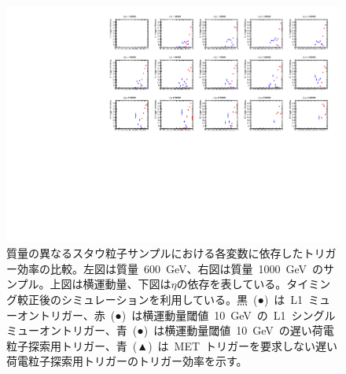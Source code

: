 \begin{figure}[tbp]
\begin{minipage}{0.49\hsize}
    \end{minipage}
    \begin{minipage}{0.49\hsize}
    \centering   
    \includegraphics[width=\textwidth,page=9]{img/rec/stau_1000.pdf}
    \end{minipage}
    \caption[質量の異なるスタウ粒子サンプルにおける各変数に依存したトリガー効率の比較]{質量の異なるスタウ粒子サンプルにおける各変数に依存したトリガー効率の比較。左図は質量~600~GeV、右図は質量~1000~GeV~のサンプル。上図は横運動量、下図は$\eta$の依存を表している。タイミング較正後のシミュレーションを利用している。黒~(●)~は~L1~ミューオントリガー、赤~(●)~は横運動量閾値~10~GeV~の~L1~シングルミューオントリガー、青~(●)~は横運動量閾値~10~GeV~の遅い荷電粒子探索用トリガー、青~(▲)~は~MET~トリガーを要求しない遅い荷電粒子探索用トリガーのトリガー効率を示す。}\label{fig:tript6}
\end{figure}
